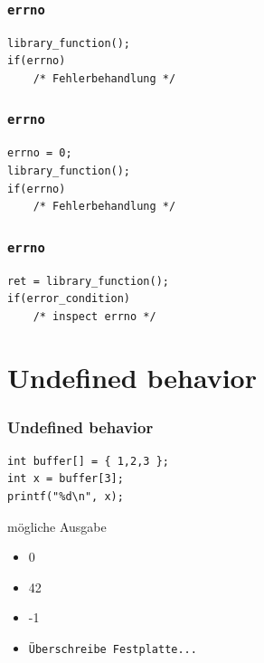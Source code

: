 \documentclass[12pt,compress]{beamer}
\begin{document}
\begin{frame}[fragile]
\frametitle{\texttt{errno}}

\begin{lstlisting}
library_function();
if(errno)
    /* Fehlerbehandlung */
\end{lstlisting}
\end{frame}

\begin{frame}[fragile]
\frametitle{\texttt{errno}}

\begin{lstlisting}
errno = 0;
library_function();
if(errno)
    /* Fehlerbehandlung */
\end{lstlisting}
\end{frame}

\begin{frame}[fragile]
\frametitle{\texttt{errno}}

\begin{lstlisting}
ret = library_function();
if(error_condition)
    /* inspect errno */
\end{lstlisting}
\end{frame}

\section{Undefined behavior}


\begin{frame}[fragile]
\frametitle{Undefined behavior}

\begin{lstlisting}
int buffer[] = { 1,2,3 };
int x = buffer[3];
printf("%d\n", x);
\end{lstlisting}

\vfill

mögliche Ausgabe
\begin{itemize}
\item 0
\item 42
\item -1
\item \texttt{Überschreibe Festplatte...}
\end{itemize}
\end{frame}
\end{document}

